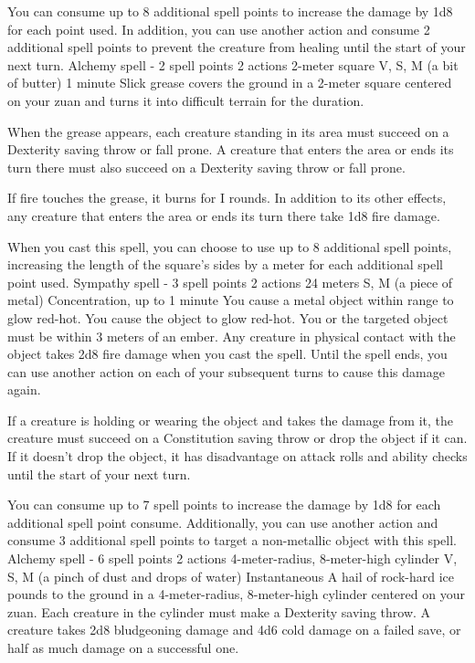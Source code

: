     You can consume up to 8 additional spell points to increase the damage by 1d8 for each point used.
    In addition, you can use another action and consume 2 additional spell points to prevent the creature from healing until the start of your next turn.
    {Alchemy spell - 2 spell points}
    {2 actions}
    {2-meter square}
    {V, S, M (a bit of butter)}
    {1 minute}
    Slick grease covers the ground in a 2-meter square centered on your zuan and turns it into difficult terrain for the duration.

    When the grease appears, each creature standing in its area must succeed on a Dexterity saving throw or fall prone.
    A creature that enters the area or ends its turn there must also succeed on a Dexterity saving throw or fall prone.

    If fire touches the grease, it burns for I rounds.
    In addition to its other effects, any creature that enters the area or ends its turn there take 1d8 fire damage.

    When you cast this spell, you can choose to use up to 8 additional spell points, increasing the length of the square's sides by a meter for each additional spell point used.
    {Sympathy spell - 3 spell points}
    {2 actions}
    {24 meters}
    {S, M (a piece of metal)}
    {Concentration, up to 1 minute}
    You cause a metal object within range to glow red-hot.
    You cause the object to glow red-hot.
    You or the targeted object must be within 3 meters of an ember.
    Any creature in physical contact with the object takes 2d8 fire damage when you cast the spell.
    Until the spell ends, you can use another action on each of your subsequent turns to cause this damage again.

    If a creature is holding or wearing the object and takes the damage from it, the creature must succeed on a Constitution saving throw or drop the object if it can.
    If it doesn't drop the object, it has disadvantage on attack rolls and ability checks until the start of your next turn.

    You can consume up to 7 spell points to increase the damage by 1d8 for each additional spell point consume.
    Additionally, you can use another action and consume 3 additional spell points to target a non-metallic object with this spell.
    {Alchemy spell - 6 spell points}
    {2 actions}
    {4-meter-radius, 8-meter-high cylinder}
    {V, S, M (a pinch of dust and drops of water)}
    {Instantaneous}
    A hail of rock-hard ice pounds to the ground in a 4-meter-radius, 8-meter-high cylinder centered on your zuan.
    Each creature in the cylinder must make a Dexterity saving throw.
    A creature takes 2d8 bludgeoning damage and 4d6 cold damage on a failed save, or half as much damage on a successful one.

